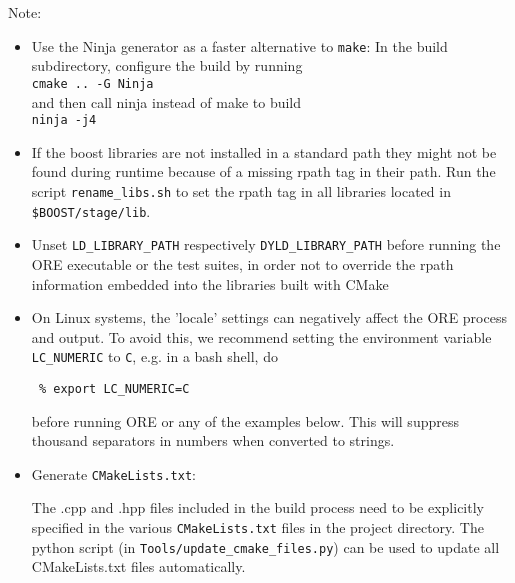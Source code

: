Note: 
\begin{itemize}
\item Use the Ninja generator as a faster alternative to {\tt make}: In the build subdirectory, configure the build by running \\
  \medskip
      {\tt cmake .. -G Ninja} \\
      \medskip
      and then call ninja instead of make to build\\
      \medskip
      {\tt ninja -j4}\\
\item If the boost libraries are not installed in a standard path they might not be found during runtime because of a missing rpath
tag in their path. Run the script {\tt rename\_libs.sh} to set the rpath tag in all libraries located in {\tt
  \${BOOST}/stage/lib}.
\item Unset {\tt LD\_LIBRARY\_PATH} respectively {\tt DYLD\_LIBRARY\_PATH} before running the ORE executable or the test suites, in order not to override the rpath information embedded into the libraries built with CMake
\item On Linux systems, the 'locale' settings can negatively affect the ORE process and output. To avoid this, we
recommend setting the environment variable {\tt LC\_NUMERIC} to {\tt C}, e.g. in a bash shell, do

{\tt\footnotesize
\% export LC\_NUMERIC=C
}

before running ORE or any of the examples below. This will suppress thousand separators in numbers when converted to
strings.

\item Generate {\tt CMakeLists.txt}:

The .cpp and .hpp files included in the build process need to be explicitly specified in the various {\tt CMakeLists.txt} 
files in the project directory. The python script (in {\tt Tools/update\_cmake\_files.py}) can be used to update all CMakeLists.txt files 
automatically. 

\end{itemize}




